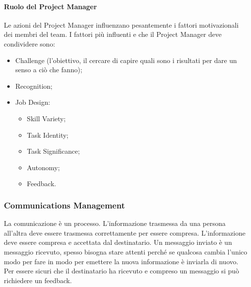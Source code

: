 \paragraph{Ruolo del Project Manager}
Le azioni del Project Manager influenzano pesantemente i fattori motivazionali dei membri del team. I fattori più influenti e che il Project Manager deve condividere sono:
\begin{itemize}
	\item Challenge (l'obiettivo, il cercare di capire quali sono i risultati per dare un senso a ciò che fanno);
	\item Recognition;
	\item Job Design:
	\begin{itemize}
		\item Skill Variety;
		\item Task Identity;
		\item Task Significance;
		\item Autonomy;
		\item Feedback.
	\end{itemize}
\end{itemize}
\subsubsection{Communications Management}
La comunicazione è un processo. L'informazione trasmessa da una persona all'altra deve essere trasmessa correttamente per essere compresa. L'informazione deve essere compresa e accettata dal destinatario. Un messaggio inviato è un messaggio ricevuto, spesso bisogna stare attenti perché se qualcosa cambia l'unico modo per fare in modo per emettere la nuova informazione è inviarla di nuovo.\newline
Per essere sicuri che il destinatario ha ricevuto e compreso un messaggio si può richiedere un feedback.

